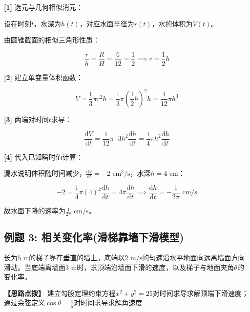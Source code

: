 \documentclass[11pt,a4paper,UTF8]{ctexart}
\begin{document}
\begin{solbox}[分步推导与答题规范]
\textbf{[1]} 选元与几何相似消元：

设在时刻$t$，水深为$h(t)$，对应水面半径为$r(t)$，水的体积为$V(t)$。

由圆锥截面的相似三角形性质：


\begin{equation*}
\frac{r}{h} = \frac{R}{H} = \frac{6}{12} = \frac{1}{2} \implies r = \frac{1}{2}h
\end{equation*}


\textbf{[2]} 建立单变量体积函数：


\begin{equation*}
V = \frac{1}{3}\pi r^2 h = \frac{1}{3}\pi \left(\frac{1}{2}h\right)^2 h = \frac{1}{12}\pi h^3
\end{equation*}


\textbf{[3]} 两端对时间$t$求导：


\begin{equation*}
\frac{\mathrm{d}V}{\mathrm{d}t} = \frac{1}{12}\pi \cdot 3h^2 \frac{\mathrm{d}h}{\mathrm{d}t} = \frac{1}{4}\pi h^2 \frac{\mathrm{d}h}{\mathrm{d}t}
\end{equation*}


\textbf{[4]} 代入已知瞬时值计算：

漏水说明体积随时间减少，$\frac{\mathrm{d}V}{\mathrm{d}t} = -2\text{ cm}^3\text{/s}$，水深$h = 4\text{ cm}$：


\begin{equation*}
-2 = \frac{1}{4}\pi (4)^2 \frac{\mathrm{d}h}{\mathrm{d}t} = 4\pi \frac{\mathrm{d}h}{\mathrm{d}t} \implies \frac{\mathrm{d}h}{\mathrm{d}t} = -\frac{1}{2\pi}\text{ cm/s}
\end{equation*}


故水面下降的速率为$\frac{1}{2\pi}\text{ cm/s}$。
\end{solbox}


\subsection{例题 3: 相关变化率(滑梯靠墙下滑模型)}

长为$5\text{ m}$的梯子靠在垂直的墙上。底端以$2\text{ m/s}$的匀速沿水平地面向远离墙面方向滑动。当底端离墙面$3\text{ m}$时，求顶端沿墙面下滑的速度，以及梯子与地面夹角$\theta$的变化率。

\textbf{\color{DeepPurple}【思路点拨】} 建立勾股定理约束方程$x^2 + y^2 = 25$对时间求导求解顶端下滑速度；通过余弦定义$\cos\theta = \frac{x}{5}$对时间求导求解角速度
\end{document}
